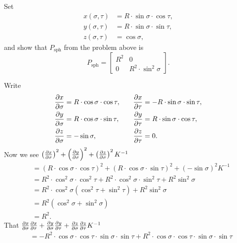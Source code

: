 \documentclass{ximera}
\begin{document}
\begin{problem}
  Set
  \begin{align*}
    x(\sigma,\tau) &=R\cdot \sin\sigma\cdot \cos \tau,\\
    y(\sigma,\tau) &=R\cdot \sin\sigma\cdot \sin\tau,\\
    z(\sigma,\tau) &=\cos \sigma,
  \end{align*}
  and show that $P_\mathrm{sph}$ from the problem above is
  \[
  P_\mathrm{sph} =
  \begin{bmatrix}
    R^2 & 0 \\
    0 & R^2\cdot\sin^2 \sigma
  \end{bmatrix}.
  \]
  \begin{freeResponse}
    Write
    \[
    \begin{split}
      \pp[x]{\sigma} &= R\cdot \cos\sigma\cdot \cos \tau, \\
      \pp[y]{\sigma} &= R\cdot \cos\sigma\cdot \sin\tau,\\
      \pp[z]{\sigma} &= -\sin\sigma,
    \end{split}
    \qquad
    \begin{split}
      \pp[x]{\tau} &= -R\cdot \sin\sigma\cdot \sin \tau,\\
      \pp[y]{\tau} &= R\cdot \sin\sigma\cdot \cos\tau,\\
      \pp[z]{\tau} &= 0. 
    \end{split}
    \]
    Now we see $\left(\pp[x]{\sigma}\right)^2 + \left(\pp[y]{\sigma}\right)^2 + \left(\pp[z]{\sigma}\right)^2K^{-1}$
    \begin{align*}
      &= \left(R\cdot \cos\sigma\cdot \cos \tau \right)^2 + \left(R\cdot \cos\sigma\cdot \sin\tau\right)^2 + \left(-\sin\sigma\right)^2K^{-1}\\
      &= R^2\cdot \cos^2\sigma\cdot \cos^2 \tau + R^2\cdot \cos^2\sigma\cdot \sin^2\tau + R^2 \sin^2\sigma \\
      &= R^2\cdot \cos^2\sigma\left(\cos^2 \tau + \sin^2\tau\right) + R^2 \sin^2\sigma \\
      &= R^2\left(\cos^2\sigma + \sin^2\sigma\right) \\
      &= R^2.
    \end{align*}
    That $\pp[x]{\sigma}\pp[x]{\tau} + \pp[y]{\sigma}\pp[y]{\tau} + \pp[z]{\sigma}\pp[z]{\tau} K^{-1}$
    \begin{align*}
      &= -R^2\cdot \cos\sigma\cdot \cos \tau \cdot \sin\sigma\cdot \sin \tau + R^2\cdot \cos\sigma\cdot \cos \tau \cdot \sin\sigma\cdot \sin \tau\\

\end{align*}
\end{freeResponse}
\end{problem}
\end{document}
